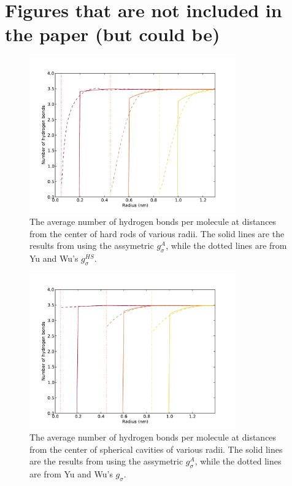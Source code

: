 \clearpage

\section{Figures that are not included in the paper (but could be)}

\begin{figure}
\begin{center}
\includegraphics[width=3.5in]{figs/single-rod-X-plot}
\end{center}
\caption{ The average number of hydrogen bonds per molecule at
  distances from the center of hard rods of various
  radii. The solid lines are the results from using the assymetric
  $g_{\sigma}^A$, while the dotted lines are from Yu and Wu's $g_{\sigma}^{HS}$.}
\label{fig:single-rod-X}
\end{figure}

\begin{figure}
\begin{center}
\includegraphics[width=3.5in]{figs/spheres-X-plot}
\end{center}
\caption{ The average number of hydrogen bonds per molecule at
  distances from the center of spherical cavities of various
  radii. The solid lines are the results from using the assymetric
  $g_{\sigma}^A$, while the dotted lines are from Yu and Wu's $g_{\sigma}$.}
\label{fig:spheres-X}
\end{figure}
